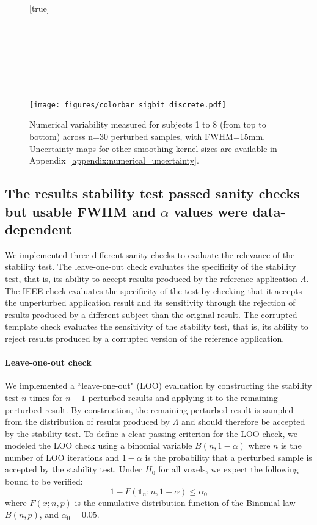 \documentclass[lettersize,journal]{IEEEtran}
\begin{document}
\begin{figure}
  \centering
  [true] \\
   \\
   \\
   \\
   \\
   \\
   \\
   \\
  \texttt{[image: figures/colorbar\_sigbit\_discrete.pdf]}
  \caption{Numerical variability measured for subjects 1 to 8 (from top to bottom) across n=30 perturbed samples, with FWHM=15mm. Uncertainty maps for other smoothing kernel sizes are available in Appendix~\ref{appendix:numerical_uncertainty}.}
  \label{fig:uncertainty-maps}
\end{figure}


\subsection{The results stability test passed sanity checks but usable FWHM and $\alpha$ values were data-dependent}

We implemented three different sanity checks to evaluate the relevance of the stability test.
The leave-one-out check evaluates the specificity of the stability test, that is, its ability to accept results produced by the reference application $\Lambda$.
The IEEE check evaluates the specificity of the test by checking that it accepts the unperturbed application result and its sensitivity through the rejection of results produced by a different subject than the original result.
The corrupted template check evaluates the sensitivity of the stability test, that is, its ability to reject results produced by a corrupted version of the reference application.

\paragraph{Leave-one-out check} We implemented a ``leave-one-out" (LOO) evaluation by constructing the stability test $n$ times for $n-1$ perturbed results and applying it to the remaining perturbed result. By construction, the remaining perturbed result is sampled from the distribution of results produced by $\Lambda$ and should therefore be accepted by the stability test.
To define a clear passing criterion for the LOO check, we modeled the LOO check using a binomial variable $B(n,1-\alpha)$ where $n$ is the number of LOO iterations and $1-\alpha$ is the probability that a perturbed sample is accepted by the stability test. Under $H_0$ for all voxels, we expect the following bound to be verified:
\[
  1-F(\mathds{1}_n;n,1-\alpha) \leq \alpha_0
\]
where $F(x;n,p)$ is the cumulative distribution function of the Binomial law $B(n,p)$, and $\alpha_0=0.05$.
\end{document}
